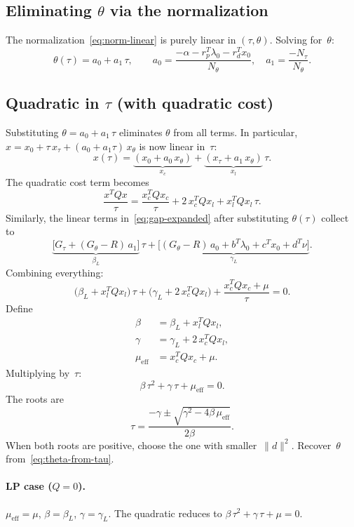 \documentclass{article}
\begin{document}
\subsection{Eliminating $\theta$ via the normalization}

The normalization~\eqref{eq:norm-linear} is purely linear in $(\tau,\theta)$.
Solving for~$\theta$:
\begin{equation} \label{eq:theta-from-tau}
  \theta(\tau) = a_0 + a_1\,\tau, \qquad
  a_0 = \frac{-\alpha - r_p^T\lambda_0 - r_d^T x_0}{N_\theta}, \quad
  a_1 = \frac{-N_\tau}{N_\theta}.
\end{equation}

\subsection{Quadratic in $\tau$ (with quadratic cost)}

Substituting $\theta = a_0 + a_1\,\tau$ eliminates $\theta$ from
all terms.  In particular, $x = x_0 + \tau\,x_\tau + (a_0 + a_1\tau)\,x_\theta$
is now linear in~$\tau$:
\[
  x(\tau) = \underbrace{(x_0 + a_0\,x_\theta)}_{x_c}
           + \underbrace{(x_\tau + a_1\,x_\theta)}_{x_l}\,\tau.
\]
The quadratic cost term becomes
\[
  \frac{x^T Q x}{\tau}
  = \frac{x_c^T Q x_c}{\tau}
  + 2\,x_c^T Q x_l
  + x_l^T Q x_l\,\tau.
\]
Similarly, the linear terms in~\eqref{eq:gap-expanded} after substituting
$\theta(\tau)$ collect to
\[
  \underbrace{\bigl[G_\tau + (G_\theta - R)\,a_1\bigr]}_{\beta_L}\,\tau
  + \underbrace{\bigl[(G_\theta - R)\,a_0 + b^T\lambda_0 + c^T x_0 + d^T\nu\bigr]}_{\gamma_L}.
\]
Combining everything:
\[
  \bigl(\beta_L + x_l^T Q x_l\bigr)\,\tau
  + \bigl(\gamma_L + 2\,x_c^T Q x_l\bigr)
  + \frac{x_c^T Q x_c + \mu}{\tau}
  = 0.
\]
Define
\begin{align*}
  \beta &= \beta_L + x_l^T Q x_l, \\
  \gamma &= \gamma_L + 2\,x_c^T Q x_l, \\
  \mu_{\mathrm{eff}} &= x_c^T Q x_c + \mu.
\end{align*}
Multiplying by~$\tau$:
\begin{equation} \label{eq:tau-quadratic}
  \boxed{\beta\,\tau^2 + \gamma\,\tau + \mu_{\mathrm{eff}} = 0.}
\end{equation}
The roots are
\[
  \tau = \frac{-\gamma \pm \sqrt{\gamma^2 - 4\beta\,\mu_{\mathrm{eff}}}}{2\beta}.
\]
When both roots are positive, choose the one with smaller~$\|d\|^2$.
Recover~$\theta$ from~\eqref{eq:theta-from-tau}.

\paragraph{LP case ($Q = 0$).}  $\mu_{\mathrm{eff}} = \mu$,
$\beta = \beta_L$, $\gamma = \gamma_L$.  The quadratic reduces to
$\beta\,\tau^2 + \gamma\,\tau + \mu = 0$.
\end{document}
